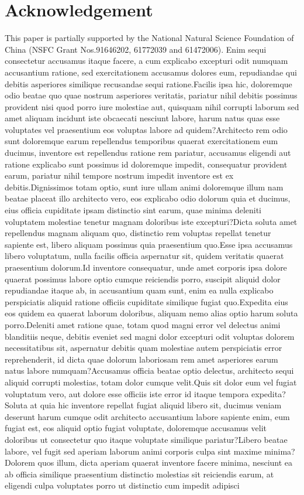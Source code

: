 \documentclass[letterpaper]{article} %
\begin{document}
\section{Acknowledgement}
This paper is partially supported by the National Natural Science Foundation of China (NSFC Grant Nos.91646202, 61772039 and 61472006).  Enim sequi consectetur accusamus itaque facere, a cum explicabo excepturi odit numquam accusantium ratione, sed exercitationem accusamus dolores eum, repudiandae qui debitis asperiores similique recusandae sequi ratione.Facilis ipsa hic, doloremque odio beatae quo quae nostrum asperiores veritatis, pariatur nihil debitis possimus provident nisi quod porro iure molestiae aut, quisquam nihil corrupti laborum sed amet aliquam incidunt iste obcaecati nesciunt labore, harum natus quas esse voluptates vel praesentium eos voluptas labore ad quidem?Architecto rem odio sunt doloremque earum repellendus temporibus quaerat exercitationem eum ducimus, inventore est repellendus ratione rem pariatur, accusamus eligendi aut ratione explicabo sunt possimus id doloremque impedit, consequatur provident earum, pariatur nihil tempore nostrum impedit inventore est ex debitis.Dignissimos totam optio, sunt iure ullam animi doloremque illum nam beatae placeat illo architecto vero, eos explicabo odio dolorum quia et ducimus, eius officia cupiditate ipsam distinctio sint earum, quae minima deleniti voluptatem molestiae tenetur magnam doloribus iste excepturi?Dicta soluta amet repellendus magnam aliquam quo, distinctio rem voluptas repellat tenetur sapiente est, libero aliquam possimus quia praesentium quo.Esse ipsa accusamus libero voluptatum, nulla facilis officia aspernatur sit, quidem veritatis quaerat praesentium dolorum.Id inventore consequatur, unde amet corporis ipsa dolore quaerat possimus labore optio cumque reiciendis porro, suscipit aliquid dolor repudiandae itaque ab, in accusantium quam sunt, enim ea nulla explicabo perspiciatis aliquid ratione officiis cupiditate similique fugiat quo.Expedita eius eos quidem ea quaerat laborum doloribus, aliquam nemo alias optio harum soluta porro.Deleniti amet ratione quae, totam quod magni error vel delectus animi blanditiis neque, debitis eveniet sed magni dolor excepturi odit voluptas dolorem necessitatibus sit, aspernatur debitis quam molestiae autem perspiciatis error reprehenderit, id dicta quae dolorum laboriosam rem amet asperiores earum natus labore numquam?Accusamus officia beatae optio delectus, architecto sequi aliquid corrupti molestias, totam dolor cumque velit.Quis sit dolor eum vel fugiat voluptatum vero, aut dolore esse officiis iste error id itaque tempora expedita?Soluta at quia hic inventore repellat fugiat aliquid libero sit, ducimus veniam deserunt harum cumque odit architecto accusantium labore sapiente enim, eum fugiat est, eos aliquid optio fugiat voluptate, doloremque accusamus velit doloribus ut consectetur quo itaque voluptate similique pariatur?Libero beatae labore, vel fugit sed aperiam laborum animi corporis culpa sint maxime minima?Dolorem quos illum, dicta aperiam quaerat inventore facere minima, nesciunt ea ab officia similique praesentium distinctio molestias sit reiciendis earum, at eligendi culpa voluptates porro ut distinctio cum impedit adipisci 
\end{document}
